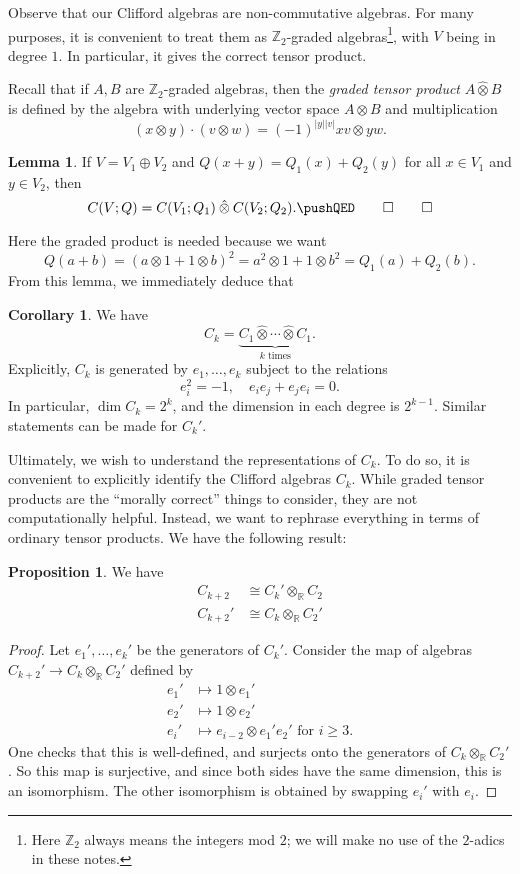 \documentclass{shortart}
\theoremstyle{definition}
\newtheorem*{prop}{Proposition}
\newtheorem*{cor}{Corollary}
\newtheorem*{lemma}{Lemma}
\newcommand\R{\mathbb{R}}
\newcommand\Z{\mathbb{Z}}
\newcommand\gotimes{\mathbin{\hat\otimes}}
\begin{document}
Observe that our Clifford algebras are non-commutative algebras. For many purposes, it is convenient to treat them as $\Z_2$-graded algebras\footnote{Here $\Z_2$ always means the integers mod $2$; we will make no use of the $2$-adics in these notes.}, with $V$ being in degree $1$. In particular, it gives the correct tensor product.

Recall that if $A, B$ are $\Z_2$-graded algebras, then the \emph{graded tensor product} $A \gotimes B$ is defined by the algebra with underlying vector space $A \otimes B$ and multiplication
\[
  (x \otimes y) \cdot (v \otimes w) = (-1)^{|y| |v|} xv \otimes yw.
\]

\begin{lemma}
  If $V = V_1 \oplus V_2$ and $Q(x + y) = Q_1(x) + Q_2(y)$ for all $x \in V_1$ and $y \in V_2$, then
  \[
    C(V; Q) = C(V_1; Q_1) \gotimes C(V_2; Q_2).\fakeqed%
  \]
\end{lemma}
Here the graded product is needed because we want
\[
  Q(a + b) = (a \otimes 1 + 1 \otimes b)^2 = a^2 \otimes 1 + 1 \otimes b^2 = Q_1(a) + Q_2(b).
\]
From this lemma, we immediately deduce that
\begin{cor}
  We have
  \[
    C_k = \underbrace{C_1 \gotimes \cdots \gotimes C_1}_{k\text{ times}}.
  \]
  Explicitly, $C_k$ is generated by $e_1, \ldots, e_k$ subject to the relations
  \[
    e_i^2 = -1,\quad e_i e_j + e_j e_i = 0.
  \]
  In particular, $\dim C_k = 2^k$, and the dimension in each degree is $2^{k - 1}$. Similar statements can be made for $C_k'$.
\end{cor}

Ultimately, we wish to understand the representations of $C_k$. To do so, it is convenient to explicitly identify the Clifford algebras $C_k$. While graded tensor products are the ``morally correct'' things to consider, they are not computationally helpful. Instead, we want to rephrase everything in terms of ordinary tensor products. We have the following result:

\begin{prop}
  We have
  \begin{align*}
    C_{k + 2} &\cong C_k' \otimes_\R C_2\\
    C_{k + 2}' &\cong C_k \otimes_\R C_2'
  \end{align*}
\end{prop}

\begin{proof}
  Let $e_1', \ldots, e_k'$ be the generators of $C_k'$. Consider the map of algebras $C_{k + 2}' \to C_k \otimes_\R C_2'$ defined by
  \begin{align*}
    e_1' &\mapsto 1 \otimes e_1'\\
    e_2' &\mapsto 1 \otimes e_2'\\
    e_i' &\mapsto e_{i - 2} \otimes e_1' e_2'\text{ for }i \geq 3.
  \end{align*}
  One checks that this is well-defined, and surjects onto the generators of $C_k \otimes_\R C_2'$. So this map is surjective, and since both sides have the same dimension, this is an isomorphism. The other isomorphism is obtained by swapping $e_i'$ with $e_i$.
\end{proof}
\end{document}
